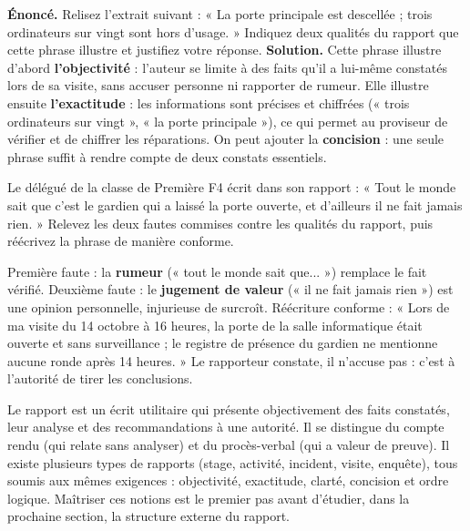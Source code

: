 \documentclass[11pt]{article}
\begin{document}
\begin{exoresolu}
\textbf{Énoncé.} Relisez l'extrait suivant : « La porte principale est descellée ; trois ordinateurs sur vingt sont hors d'usage. » Indiquez deux qualités du rapport que cette phrase illustre et justifiez votre réponse.
\tcblower
\textbf{Solution.} Cette phrase illustre d'abord \textbf{l'objectivité} : l'auteur se limite à des faits qu'il a lui-même constatés lors de sa visite, sans accuser personne ni rapporter de rumeur. Elle illustre ensuite \textbf{l'exactitude} : les informations sont précises et chiffrées (« trois ordinateurs sur vingt », « la porte principale »), ce qui permet au proviseur de vérifier et de chiffrer les réparations. On peut ajouter la \textbf{concision} : une seule phrase suffit à rendre compte de deux constats essentiels.
\end{exoresolu}

\begin{exercice}
Le délégué de la classe de Première F4 écrit dans son rapport : « Tout le monde sait que c'est le gardien qui a laissé la porte ouverte, et d'ailleurs il ne fait jamais rien. » Relevez les deux fautes commises contre les qualités du rapport, puis réécrivez la phrase de manière conforme.
\end{exercice}

\begin{corrige}
Première faute : la \textbf{rumeur} (« tout le monde sait que... ») remplace le fait vérifié. Deuxième faute : le \textbf{jugement de valeur} (« il ne fait jamais rien ») est une opinion personnelle, injurieuse de surcroît. Réécriture conforme : « Lors de ma visite du 14 octobre à 16 heures, la porte de la salle informatique était ouverte et sans surveillance ; le registre de présence du gardien ne mentionne aucune ronde après 14 heures. » Le rapporteur constate, il n'accuse pas : c'est à l'autorité de tirer les conclusions.
\end{corrige}

\begin{aretenir}
Le rapport est un écrit utilitaire qui présente objectivement des faits constatés, leur analyse et des recommandations à une autorité. Il se distingue du compte rendu (qui relate sans analyser) et du procès-verbal (qui a valeur de preuve). Il existe plusieurs types de rapports (stage, activité, incident, visite, enquête), tous soumis aux mêmes exigences : objectivité, exactitude, clarté, concision et ordre logique. Maîtriser ces notions est le premier pas avant d'étudier, dans la prochaine section, la structure externe du rapport.
\end{aretenir}
\end{document}

